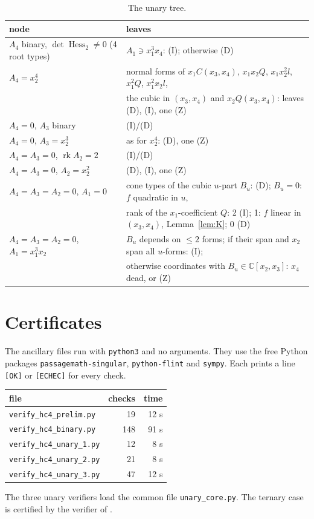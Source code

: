 \documentclass[11pt]{article}
\theoremstyle{remark}
\newcommand{\C}{\mathbb{C}}
\newcommand{\Hess}{\operatorname{Hess}}
\begin{document}
\begin{table}[h]\centering\small
\begin{tabular}{@{}ll@{}}\toprule
node & leaves\\\midrule
$A_4$ binary, $\det\Hess_2\ne0$ (4 root types) & $A_1\ni x_1^3x_4$: (I); otherwise (D)\\
$A_4=x_2^4$ & normal forms of $x_1C(x_3,x_4)$, $x_1x_2Q$, $x_1x_2^2l$, $x_1^2Q$, $x_1^2x_2l$, \\
 & the cubic in $(x_3,x_4)$ and $x_2Q(x_3,x_4)$: leaves (D), (I), one (Z)\\
$A_4=0$, $A_3$ binary & (I)/(D)\\
$A_4=0$, $A_3=x_2^3$ & as for $x_2^4$: (D), one (Z)\\
$A_4=A_3=0$, $\operatorname{rk}A_2=2$ & (I)/(D)\\
$A_4=A_3=0$, $A_2=x_2^2$ & (D), (I), one (Z)\\
$A_4=A_3=A_2=0$, $A_1=0$ & cone types of the cubic $u$-part $B_u$: (D); $B_u=0$: $f$ quadratic in $u$, \\
 & rank of the $x_1$-coefficient $Q$: 2 (I); 1: $f$ linear in $(x_3,x_4)$, Lemma~\ref{lem:K}; 0 (D)\\
$A_4=A_3=A_2=0$, $A_1=x_1^3x_2$ & $B_u$ depends on $\le2$ forms; if their span and $x_2$ span all $u$-forms: (I);\\
 & otherwise coordinates with $B_u\in\C[x_2,x_3]$: $x_4$ dead, or (Z)\\\bottomrule
\end{tabular}
\caption{The unary tree.}\label{tab:un}
\end{table}

\section{Certificates}\label{sec:cert}
The ancillary files run with \texttt{python3} and no arguments. They use the free Python packages \texttt{passagemath-singular}, \texttt{python-flint} and \texttt{sympy}. Each prints a line \texttt{[OK]} or \texttt{[ECHEC]} for every check.

\begin{center}\small
\begin{tabular}{@{}lrr@{}}\toprule
file & checks & time\\\midrule
\texttt{verify\_hc4\_prelim.py} & 19 & 12 s\\
\texttt{verify\_hc4\_binary.py} & 148 & 91 s\\
\texttt{verify\_hc4\_unary\_1.py} & 12 & 8 s\\
\texttt{verify\_hc4\_unary\_2.py} & 21 & 8 s\\
\texttt{verify\_hc4\_unary\_3.py} & 47 & 12 s\\\bottomrule
\end{tabular}
\end{center}
The three unary verifiers load the common file \texttt{unary\_core.py}. The ternary case is certified by the verifier of \cite{NGtern}.
\end{document}
